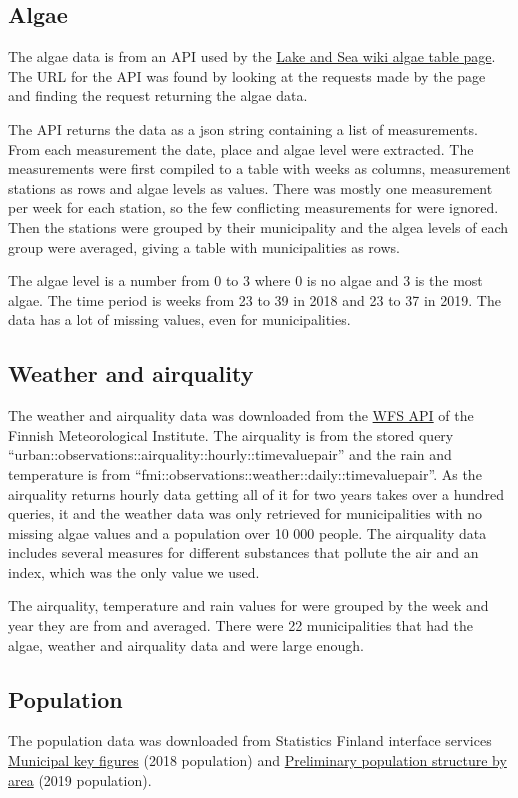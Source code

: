 \documentclass[a4paper, 12pt, english]{article}
\begin{document}
\subsection{Algae}
The algae data is from an API used by the
\href{https://www.jarviwiki.fi/wiki/Toiminnot:Semanttinen_kysely/Lev%C3%A4taulukko}
{Lake and Sea wiki algae table page}.
The URL for the API was found by looking at the requests made by
the page and finding the request returning the algae data.

The API returns the data as a json string containing a list of
measurements. From each measurement the date, place and algae level were
extracted. The measurements were first compiled to a table with weeks
as columns, measurement stations as rows and algae levels as values.
There was mostly one measurement per week for each station, so the
few conflicting measurements for were ignored. Then the stations
were grouped by their municipality and the algea levels of each group
were averaged, giving a table with municipalities as rows.

The algae level is a number from 0 to 3 where 0 is no algae
and 3 is the most algae. The time period is weeks from 23 to 39
in 2018 and 23 to 37 in 2019.
The data has a lot of missing values, even for municipalities.

\subsection{Weather and airquality}
The weather and airquality data was downloaded from the
\href{https://en.ilmatieteenlaitos.fi/open-data-manual-fmi-wfs-services}{WFS API}
of the Finnish Meteorological Institute.
The airquality is from the stored query
\mbox{``urban::observations::airquality::hourly::timevaluepair''}
and the rain and temperature is from
\mbox{``fmi::observations::weather::daily::timevaluepair''}.
As the airquality returns hourly data getting all of it
for two years takes over a hundred queries,
it and the weather data was only retrieved for
municipalities with no missing algae values and
a population over 10 000 people. The airquality data includes
several measures for different substances that
pollute the air and an index, which was the only value
we used.

The airquality, temperature and rain values for were
grouped by the week and year they are from and
averaged. There were 22 municipalities that had the
algae, weather and airquality data and were large
enough.

\subsection{Population}
The population data was downloaded from Statistics Finland interface services
\href{https://pxnet2.stat.fi/PXWeb/pxweb/en/Kuntien_avainluvut/Kuntien_avainluvut__2019/kuntien_avainluvut_2019_aikasarja.px/table/tableViewLayout1/?rxid=444223df-f91c-4479-891f-5dcd50b983d2}
{Municipal key figures} (2018 population) and
\href{http://pxnet2.stat.fi/PXWeb/pxweb/fi/StatFin/StatFin__vrm__vamuu/statfin_vamuu_pxt_11lj.px/table/tableViewLayout1/}{Preliminary population structure by area} (2019 population).
\end{document}
